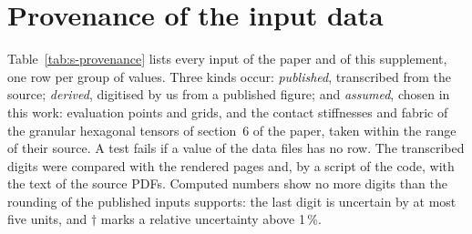 \section{Provenance of the input data}\label{sup:provenance}

Table~\ref{tab:s-provenance} lists every input of the paper and of this supplement, one
row per group of values. Three kinds occur: \emph{published}, transcribed from the source;
\emph{derived}, digitised by us from a published figure; and \emph{assumed}, chosen in this
work: evaluation points and grids, and the contact stiffnesses and fabric of the granular
hexagonal tensors of section~6 of the paper, taken within the range of their source. A test fails if a value of
the data files has no row. The transcribed digits were compared with the rendered pages
and, by a script of the code, with the text of the source PDFs. Computed numbers show no
more digits than the rounding of the published inputs supports: the last digit is
uncertain by at most five units, and $\dagger$ marks a relative uncertainty above 1\,\%.

\newcommand{\ProvenanceCaption}{Provenance of the input data: one row per group of values
(identifier P01--P19), with its kind, source, location in the source, units and rule of
use.\label{tab:s-provenance}}
\begin{landscape}
\footnotesize\setlength{\LTcapwidth}{\linewidth}

\end{landscape}
